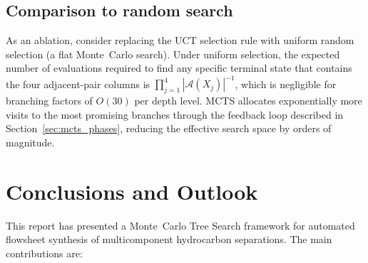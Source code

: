 \documentclass[11pt,a4paper]{article}
\theoremstyle{definition}
\theoremstyle{plain}
\newcommand{\calA}{\mathcal{A}}
\newcommand{\abs}[1]{\left|#1\right|}
\begin{document}
\subsection{Comparison to random search}

As an ablation, consider replacing the UCT selection rule with uniform random selection (a flat Monte~Carlo search). Under uniform selection, the expected number of evaluations required to find any specific terminal state that contains the four adjacent-pair columns is $\prod_{j=1}^{4} \abs{\calA(X_j)}^{-1}$, which is negligible for branching factors of $O(30)$ per depth level. MCTS allocates exponentially more visits to the most promising branches through the feedback loop described in Section~\ref{sec:mcts_phases}, reducing the effective search space by orders of magnitude.

\section{Conclusions and Outlook}
\label{sec:conclusions}

This report has presented a Monte~Carlo Tree Search framework for automated flowsheet synthesis of multicomponent hydrocarbon separations. The main contributions are:
\end{document}
